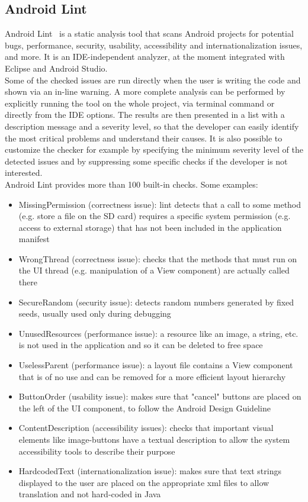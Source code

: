 \documentclass[11pt,a4paper,notitlepage]{article}
\begin{document}
\subsection{Android Lint}
Android Lint~\cite{Lint} is a static analysis tool that scans Android projects for potential bugs, performance, security, usability, accessibility and internationalization issues, and more. It is an IDE-independent analyzer, at the moment integrated with Eclipse and Android Studio.\medskip \\
Some of the checked issues are run directly when the user is writing the code and shown via an in-line warning. A more complete analysis can be performed by explicitly running the tool on the whole project, via terminal command or directly from the IDE options. The results are then presented in a list with a description message and a severity level, so that the developer can easily identify the most critical problems and understand their causes. It is also possible to customize the checker for example by specifying the minimum severity level of the detected issues and by suppressing some specific checks if the developer is not interested.\medskip \\
Android Lint provides more than 100 built-in checks. Some examples:
\begin{itemize}
	\item MissingPermission (correctness issue): lint detects that a call to some method (e.g. store a file on the SD card) requires a specific system permission (e.g. access to external storage) that has not been included in the application manifest
	\item WrongThread (correctness issue): checks that the methods that must run on the UI thread (e.g. manipulation of a View component) are actually called there
	\item SecureRandom (security issue): detects random numbers generated by fixed seeds, usually used only during debugging
	\item UnusedResources (performance issue): a resource like an image, a string, etc. is not used in the application and so it can be deleted to free space
	\item UselessParent (performance issue): a layout file contains a View component that is of no use and can be removed for a more efficient layout hierarchy
	\item ButtonOrder (usability issue): makes sure that "cancel" buttons are placed on the left of the UI component, to follow the Android Design Guideline 
	\item ContentDescription (accessibility issues): checks that important visual elements like image-buttons have a textual description to allow the system accessibility tools to describe their purpose
	\item HardcodedText (internationalization issue): makes sure that text strings displayed to the user are placed on the appropriate xml files to allow translation and not hard-coded in Java
\end{itemize}
\end{document}
